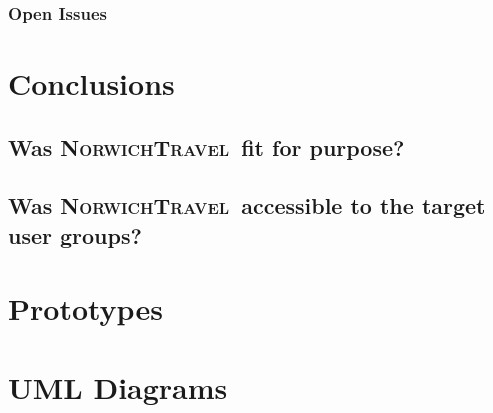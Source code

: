 \documentclass[cmpstyle]{ueacmpstyle}
\newcommand{\nt}{\textsc{NorwichTravel}}
\begin{document}
			\subsubsection{Open Issues} \label{sec:open}
	\section{Conclusions} \label{sec:conc}
	
		\subsection{Was \nt \ fit for purpose?} \label{sec:fit}
		
		\subsection{Was \nt \ accessible to the target user groups?} \label{sec:accessibletotarget}
	
	
	
	
	\appendix
	\section{Prototypes}
	
	\section{UML Diagrams}
\end{document}
